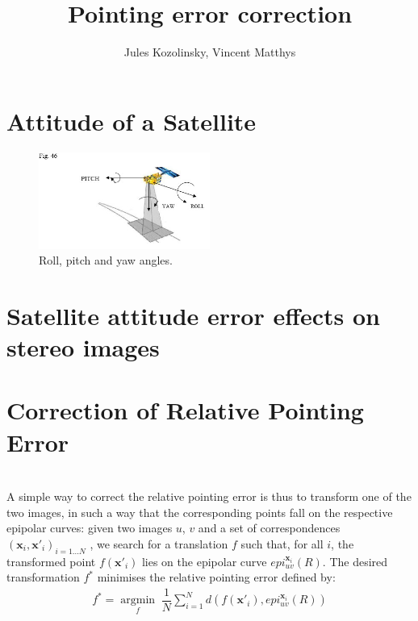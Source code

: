 \documentclass[paper=a4, fontsize=11pt]{article}
\title{\normalfont \normalsize
\huge Pointing error correction}
\author{Jules Kozolinsky, Vincent Matthys}
\date{}
\newcommand{\argmin}[1]{\underset{#1}{\operatorname{argmin}}\;}
\begin{document}
\maketitle

\section{Attitude of a Satellite}

\begin{figure}[h]
	\centering
	\includegraphics[width=0.5\textwidth]{figures/angles.jpg}
   \caption{ Roll, pitch and yaw angles.}
   \label{angles}
\end{figure}

\section{Satellite attitude error effects on stereo images}
\label{sec:sensibility}

\section{Correction of Relative Pointing Error}
\cite{de2014automatic}\\

A simple way to correct the relative pointing error is thus to transform one of the two images, in such a way that the corresponding points fall on the respective epipolar curves: given two images $u$, $v$ and a set of correspondences $(\textbf{x}_i , \textbf{x}'_i)_{i=1...N}$ , we search for a translation $f$ such that, for all $i$, the transformed point $f(\textbf{x}'_i)$ lies on the epipolar curve $epi^{\textbf{x}_i}_{u v}(R)$.
The desired transformation $f^{*}$ minimises the relative pointing error defined by:
\begin{align}
\label{minif}
f^* = \argmin{f} \dfrac{1}{N} \sum\limits_{i=1}^{N} d(f(\textbf{x}'_i), epi^{\textbf{x}_i}_{u v}(R))
\end{align}
\end{document}
